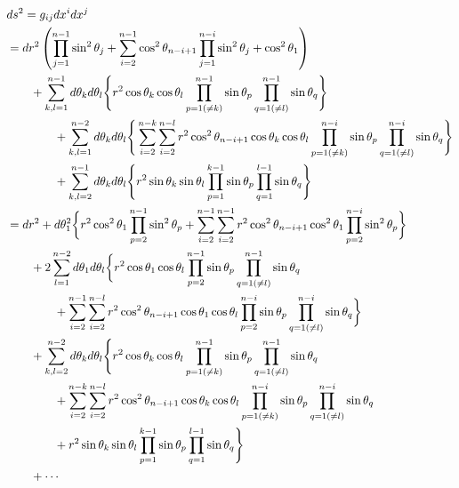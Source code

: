 \begin{align}
    &
    ds^2
=
    g_{ij} dx^i dx^j
\notag\\&
=
    d r^2
    \left(
        \prod_{j=1}^{n - 1}
        \sin^2 \theta_j
    +
    \sum_{i = 2}^{n-1}
        \cos^2 \theta_{n - i + 1}
        \prod_{j=1}^{n - i}
        \sin^2 \theta_j
    +
        \cos^2 \theta_{1}
    \right)
\notag\\&\qquad
    +
    \sum_{k, l = 1}^{n - 1}
    d \theta_k
    d \theta_l
    \Bigg\{
        r^2 \cos \theta_k
        \cos \theta_l
        \prod_{p=1 (\neq k)}^{n-1}
        \sin \theta_p
        \prod_{q=1 (\neq l)}^{n-1}
        \sin \theta_q
    \Bigg\}
\notag\\&\qquad\qquad
    +
    \sum_{k, l = 1}^{n - 2}
    d \theta_k
    d \theta_l
    \Bigg\{
    \sum_{i = 2}^{n - k}
    \sum_{i = 2}^{n - l}
        r^2 \cos^2 \theta_{n - i + 1}
        \cos \theta_k
        \cos \theta_l
        \prod_{p=1 (\neq k)}^{n - i}
        \sin \theta_p
        \prod_{q=1 (\neq l)}^{n - i}
        \sin \theta_q
    \Bigg\}
\notag\\&\qquad\qquad
    +
    \sum_{k, l = 2}^{n - 1}
    d \theta_k
    d \theta_l
    \Bigg\{
        r^2 \sin \theta_{k}
        \sin \theta_{l}
        \prod_{p=1}^{k - 1}
        \sin \theta_p
        \prod_{q=1}^{l - 1}
        \sin \theta_q
    \Bigg\}
\notag\\&
=
    d r^2
    +
    d \theta_1^2
    \bigg\{
        r^2 \cos^2 \theta_1
        \prod_{p=2}^{n-1}
        \sin^2 \theta_p
    +
    \sum_{i = 2}^{n - 1}
    \sum_{i = 2}^{n - 1}
        r^2 \cos^2 \theta_{n - i + 1}
        \cos^2 \theta_1
        \prod_{p=2}^{n - i}
        \sin^2 \theta_p
    \bigg\}
\notag\\&\qquad
    +
    2 \sum_{l = 1}^{n - 2}
    d \theta_1 d \theta_l
    \bigg\{
        r^2 \cos \theta_1
        \cos \theta_l
        \prod_{p=2}^{n-1}
        \sin \theta_p
        \prod_{q=1 (\neq l)}^{n-1}
        \sin \theta_q
\notag\\&\qquad\qquad
    +
    \sum_{i = 2}^{n - 1}
    \sum_{i = 2}^{n - l}
        r^2 \cos^2 \theta_{n - i + 1}
        \cos \theta_1
        \cos \theta_l
        \prod_{p=2}^{n - i}
        \sin \theta_p
        \prod_{q=1 (\neq l)}^{n - i}
        \sin \theta_q
    \bigg\}
\notag\\&\qquad
    +
    \sum_{k, l=2}^{n - 2}
    d \theta_k
    d \theta_l
    \Bigg\{
        r^2 \cos \theta_k
        \cos \theta_l
        \prod_{p=1 (\neq k)}^{n-1}
        \sin \theta_p
        \prod_{q=1 (\neq l)}^{n-1}
        \sin \theta_q
\notag\\&\qquad\qquad
    +
    \sum_{i = 2}^{n - k}
    \sum_{i = 2}^{n - l}
        r^2 \cos^2 \theta_{n - i + 1}
        \cos \theta_k
        \cos \theta_l
        \prod_{p=1 (\neq k)}^{n - i}
        \sin \theta_p
        \prod_{q=1 (\neq l)}^{n - i}
        \sin \theta_q
\notag\\&\qquad\qquad
    +
        r^2 \sin \theta_{k}
        \sin \theta_{l}
        \prod_{p=1}^{k - 1}
        \sin \theta_p
        \prod_{q=1}^{l - 1}
        \sin \theta_q
    \Bigg\}
\notag\\&\qquad
    +
    \cdots
\end{align}

